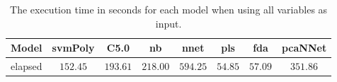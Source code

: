 \begin{table}[!ht]
	\centering
	\begin{tabular}{|c|c|c|c|c|c|c|c|}
		\hline
		Model & svmPoly & C5.0 & nb & nnet & pls & fda & pcaNNet \\ \hline
		elapsed & $152.45$ & $193.61$ & $218.00$ & $594.25$ & $54.85$ & $57.09$ & $351.86$ \\ \hline
	\end{tabular}
	\caption{The execution time in seconds for each model when using all variables as input.}
	\label{tab:time:reverse:all:total}
\end{table}
